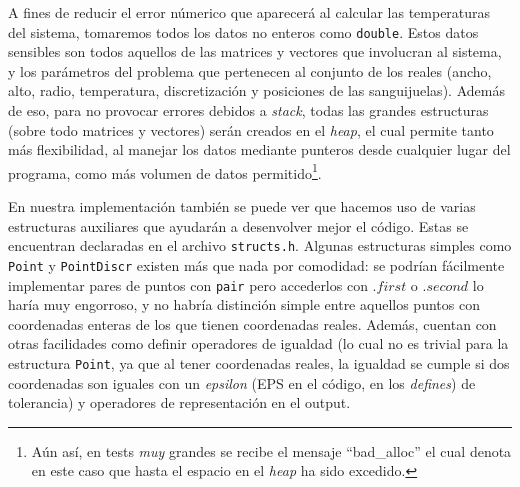 A fines de reducir el error númerico que aparecerá al calcular las temperaturas del sistema, tomaremos todos los datos no enteros como \texttt{double}. Estos datos sensibles son todos aquellos de las matrices y vectores que involucran al sistema, y los parámetros del problema que pertenecen al conjunto de los reales (ancho, alto, radio, temperatura, discretización y posiciones de las sanguijuelas). Además de eso, para no provocar errores debidos a \textit{stack}, todas las grandes estructuras (sobre todo matrices y vectores) serán creados en el \textit{heap}, el cual permite tanto más flexibilidad, al manejar los datos mediante punteros desde cualquier lugar del programa, como más volumen de datos permitido\footnote{Aún así, en tests \textit{muy} grandes se recibe el mensaje ``bad\_alloc'' el cual denota en este caso que hasta el espacio en el \textit{heap} ha sido excedido.}.

\vspace{\baselineskip}

En nuestra implementación también se puede ver que hacemos uso de varias estructuras auxiliares que ayudarán a desenvolver mejor el código. Estas se encuentran declaradas en el archivo \texttt{structs.h}. Algunas estructuras simples como \texttt{Point} y \texttt{PointDiscr} existen más que nada por comodidad: se podrían fácilmente implementar pares de puntos con \texttt{pair} pero accederlos con $.first$ o $.second$ lo haría muy engorroso, y no habría distinción simple entre aquellos puntos con coordenadas enteras de los que tienen coordenadas reales. Además, cuentan con otras facilidades como definir operadores de igualdad (lo cual no es trivial para la estructura \texttt{Point}, ya que al tener coordenadas reales, la igualdad se cumple si dos coordenadas son iguales con un \textit{epsilon} (EPS en el código, en los \textit{defines}) de tolerancia) y operadores de representación en el output.

